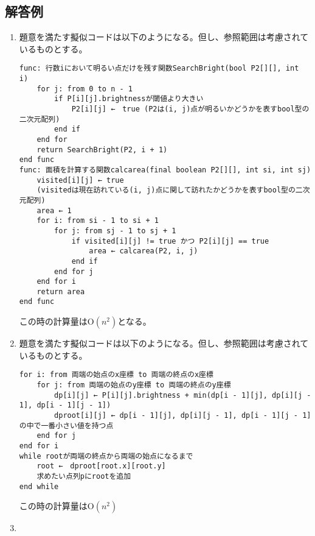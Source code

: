 \documentclass[dvipdfmx,titlepage, 11pt, a4paper]{jsarticle}%
\begin{document}
\newpage

\subsection{解答例}
\begin{enumerate}[(1)]
    \item 題意を満たす擬似コードは以下のようになる。但し、参照範囲は考慮されているものとする。
\begin{lstlisting}[frame = sigle, style = customText]
func: 行数iにおいて明るい点だけを残す関数SearchBright(bool P2[][], int i)
    for j: from 0 to n - 1
        if P[i][j].brightnessが閾値より大きい
            P2[i][j] ←　true (P2は(i, j)点が明るいかどうかを表すbool型の二次元配列)
        end if
    end for
    return SearchBright(P2, i + 1)
end func
func: 面積を計算する関数calcarea(final boolean P2[][], int si, int sj) 
    visited[i][j] ← true 
    (visitedは現在訪れている(i, j)点に関して訪れたかどうかを表すbool型の二次元配列)
    area ← 1
    for i: from si - 1 to si + 1
        for j: from sj - 1 to sj + 1
            if visited[i][j] != true かつ P2[i][j] == true
                area ← calcarea(P2, i, j)
            end if
        end for j
    end for i
    return area
end func
\end{lstlisting}
    この時の計算量は$\mathrm{O}(n^2)$となる。
    \item 題意を満たす擬似コードは以下のようになる。但し、参照範囲は考慮されているものとする。
\begin{lstlisting}[frame = single, style = customText]
for i: from 両端の始点のx座標 to 両端の終点のx座標
    for j: from 両端の始点のy座標 to 両端の終点のy座標
        dp[i][j] ← P[i][j].brightness + min(dp[i - 1][j], dp[i][j - 1], dp[i - 1][j - 1])
        dproot[i][j] ← dp[i - 1][j], dp[i][j - 1], dp[i - 1][j - 1]の中で一番小さい値を持つ点
    end for j
end for i
while rootが両端の終点から両端の始点になるまで
    root ←　dproot[root.x][root.y]
    求めたい点列pにrootを追加
end while
\end{lstlisting}
    この時の計算量は$\mathrm{O}(n^2)$
    \item 
\end{enumerate}
\newpage
\section{}%
\end{document}
